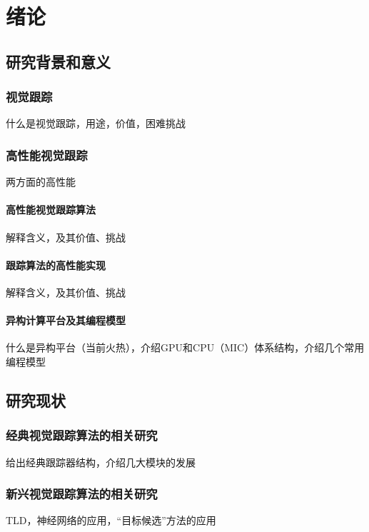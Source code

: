 \chapter{绪论}

\section{研究背景和意义}

\subsection{视觉跟踪}
什么是视觉跟踪，用途，价值，困难挑战

\subsection{高性能视觉跟踪}
两方面的高性能

\subsubsection{高性能视觉跟踪算法}
解释含义，及其价值、挑战

\subsubsection{跟踪算法的高性能实现}
解释含义，及其价值、挑战

\subsubsection{异构计算平台及其编程模型}
什么是异构平台（当前火热），介绍GPU和CPU（MIC）体系结构，介绍几个常用编程模型



\section{研究现状}

\subsection{经典视觉跟踪算法的相关研究}
给出经典跟踪器结构，介绍几大模块的发展

\subsection{新兴视觉跟踪算法的相关研究}
TLD，神经网络的应用，``目标候选''方法的应用

